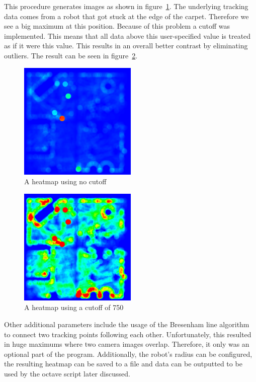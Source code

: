 \documentclass[twoside]{article}
\begin{document}
This procedure generates images as shown in figure~\ref{fig:heatmap-no-cutoff}. The underlying tracking data comes from a robot that got stuck at the edge of the carpet. Therefore we see a big maximum at this position. Because of this problem a cutoff was implemented. This means that all data above this user-specified value is treated as if it were this value. This results in an overall better contrast by eliminating outliers. The result can be seen in figure~\ref{fig:heatmap-cutoff}.

\begin{figure}
\centering
\includegraphics[width=0.5\textwidth]{./pictures/heatmap-no-cutoff.png}
\caption{A heatmap using no cutoff}
\label{fig:heatmap-no-cutoff}
\end{figure}

\begin{figure}
\centering
\includegraphics[width=0.5\textwidth]{./pictures/heatmap-cutoff-750.png}
\caption{A heatmap using a cutoff of 750}
\label{fig:heatmap-cutoff}
\end{figure}

Other additional parameters include the usage of the Bresenham line algorithm to connect two tracking points following each other. Unfortunately, this resulted in huge maximums where two camera images overlap. Therefore, it only was an optional part of the program. Additionally, the robot's radius can be configured, the resulting heatmap can be saved to a file and data can be outputted to be used by the octave script later discussed.
\end{document}
